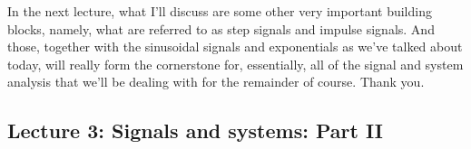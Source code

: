 \documentclass[fleqn,10pt]{olplainarticle}
\theoremstyle{definition}
\theoremstyle{remark}
\begin{document}
In the next lecture, what I'll discuss are some other very important building blocks, namely, what are referred to as step signals and impulse signals. And those, together with the sinusoidal signals and exponentials as we've talked about today, will really form the cornerstone for, essentially, all of the signal and system analysis that we'll be dealing with for the remainder of course. Thank you.

\pagebreak

\subsection*{Lecture 3: Signals and systems: Part II}
\end{document}
